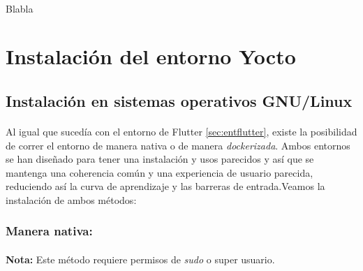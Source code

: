 \paragraph{}Blabla

\newpage

\section{Instalación del entorno Yocto}

\subsection{Instalación en sistemas operativos GNU/Linux}

\paragraph{}Al igual que sucedía con el entorno de Flutter \ref{sec:entflutter}, existe
la posibilidad de correr el entorno de manera nativa o de manera \emph{dockerizada}.
Ambos entornos se han diseñado para tener una instalación y usos parecidos y así que
se mantenga una coherencia común y una experiencia de usuario parecida, reduciendo así
la curva de aprendizaje y las barreras de entrada.Veamos la instalación de ambos métodos:

\subsubsection{Manera nativa:}

\paragraph{}\textbf{Nota:} Este método requiere permisos de \emph{sudo} o super usuario.

